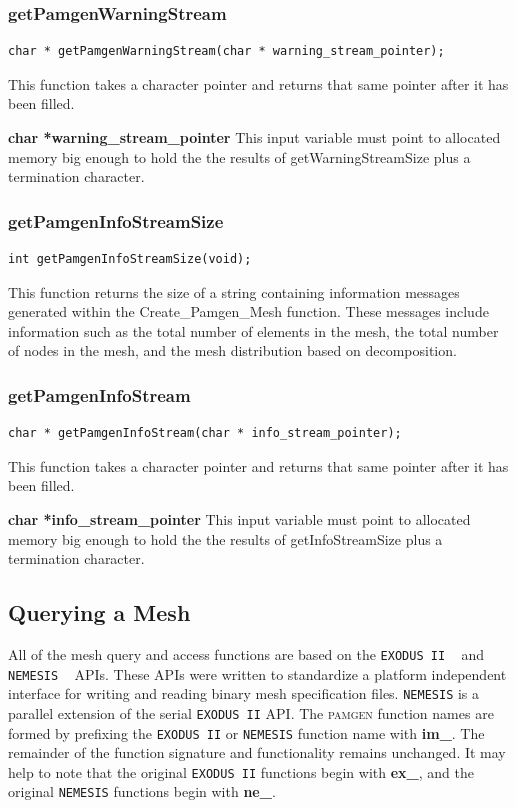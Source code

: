 \subsubsection{getPamgenWarningStream}
{\ttfamily  \begin{verbatim}
char * getPamgenWarningStream(char * warning_stream_pointer);
\end{verbatim}}
This function takes a character pointer and returns that same pointer after it has been filled.

{\setlength{\parindent}{0pt}
 \textbf{char *warning\_stream\_pointer} This input variable must point to allocated memory big enough to hold the the results of getWarningStreamSize plus a termination character.
}

\subsubsection{getPamgenInfoStreamSize}
{\ttfamily  \begin{verbatim}
int getPamgenInfoStreamSize(void);
\end{verbatim}}
This function returns the size of a string containing information messages generated within the Create\_Pamgen\_Mesh function. These messages include information such as the total number of elements in the mesh, the total number of nodes in the mesh, and the mesh distribution based on decomposition.

\subsubsection{getPamgenInfoStream}
{\ttfamily  \begin{verbatim}
char * getPamgenInfoStream(char * info_stream_pointer);
\end{verbatim}}
This function takes a character pointer and returns that same pointer after it has been filled.

{\setlength{\parindent}{0pt}
 \textbf{char *info\_stream\_pointer} This input variable must point to allocated memory big enough to hold the the results of getInfoStreamSize plus a termination character.
}
\clearpage
\subsection{Querying a Mesh}
All of the mesh query and access functions are based on the \texttt{EXODUS II} ~\cite{Schoof-Yarberry:1995} and \texttt{NEMESIS} ~\cite{Hennigan-StJohn-Shadid:1998} APIs. These APIs were written to standardize a platform independent interface for writing and reading binary mesh specification files. \texttt{NEMESIS} is a parallel extension of the serial \texttt{EXODUS II} API.  The \textsc{pamgen} function names are formed by prefixing the \texttt{EXODUS II} or \texttt{NEMESIS} function name with \textbf{im\_}. The remainder of the function signature and functionality remains unchanged. It may help to note that the original \texttt{EXODUS II} functions begin with \textbf{ex\_}, and the original \texttt{NEMESIS} functions begin with \textbf{ne\_}. 

